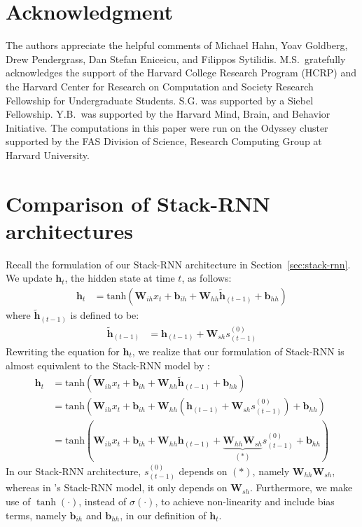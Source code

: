 \documentclass[11pt,a4paper]{article}
\theoremstyle{plain}
\newcommand{\weight}[1] {\mathbf{W}_{#1}}
\newcommand{\bias}[1] {\mathbf{b}_{#1}}
\newcommand{\hidden}[1] {\mathbf{h}_{#1}}
\newcommand{\hiddenp}[1] {\mathbf{\tilde{h}}_{#1}}
\begin{document}
\section{Acknowledgment}
The authors appreciate the helpful comments of Michael Hahn, Yoav Goldberg, Drew Pendergrass, Dan Stefan Eniceicu, and Filippos Sytilidis. M.S.\ gratefully acknowledges the support of the Harvard College Research Program (HCRP) and the Harvard Center for Research on Computation and Society Research Fellowship for Undergraduate Students. S.G. was supported by a Siebel Fellowship. Y.B.\ was supported by the Harvard Mind, Brain, and Behavior Initiative. The computations in this paper were run on the Odyssey cluster supported by the FAS Division of Science, Research Computing Group at Harvard University.





\newpage

\onecolumn

\appendix
\section{Comparison of Stack-RNN architectures}
\label{sec:appendix}

Recall the formulation of our Stack-RNN architecture in Section~\ref{sec:stack-rnn}. We update $\hidden{t}$, the hidden state at time $t$, as follows: 
\begin{align*}
    \hidden{t} &= \text{tanh}(\weight{ih} x_t + \bias{ih} + \weight{hh} \hiddenp{(t-1)} + \bias{hh})
\end{align*}
\noindent where $\hiddenp{(t-1)}$ is defined to be:
\begin{align*}
    \hiddenp{(t-1)} &= \hidden{(t-1)} + \weight{sh} s_{(t-1)}^{(0)}
\end{align*}
Rewriting the equation for $\hidden{t}$, we realize that our formulation of Stack-RNN is almost equivalent to the Stack-RNN model by \citet{joulin2015inferring}:
\begin{align*}
    \hidden{t} &= \text{tanh}(\weight{ih} x_t + \bias{ih} + \weight{hh} \hiddenp{(t-1)} + \bias{hh})\\
    &= \text{tanh}(\weight{ih} x_t + \bias{ih} + \weight{hh} (\hidden{(t-1)} + \weight{sh} s_{(t-1)}^{(0)}) + \bias{hh})\\
    &= \text{tanh}(\weight{ih} x_t + \bias{ih} + \weight{hh} \hidden{(t-1)} + \underbrace{\weight{hh} \weight{sh}}_{(*)} s_{(t-1)}^{(0)} + \bias{hh})
\end{align*}
In our Stack-RNN architecture, $s_{(t-1)}^{(0)}$ depends on $(*)$, namely $\weight{hh} \weight{sh}$, whereas in \citeauthor{joulin2015inferring}'s Stack-RNN model, it only depends on $\weight{sh}$. Furthermore, we make use of $\tanh (\cdot)$, instead of $\sigma (\cdot)$, to achieve non-linearity and include bias terms, namely $\bias{ih}$ and $\bias{hh}$, in our definition of $\hidden{t}$.
\end{document}
